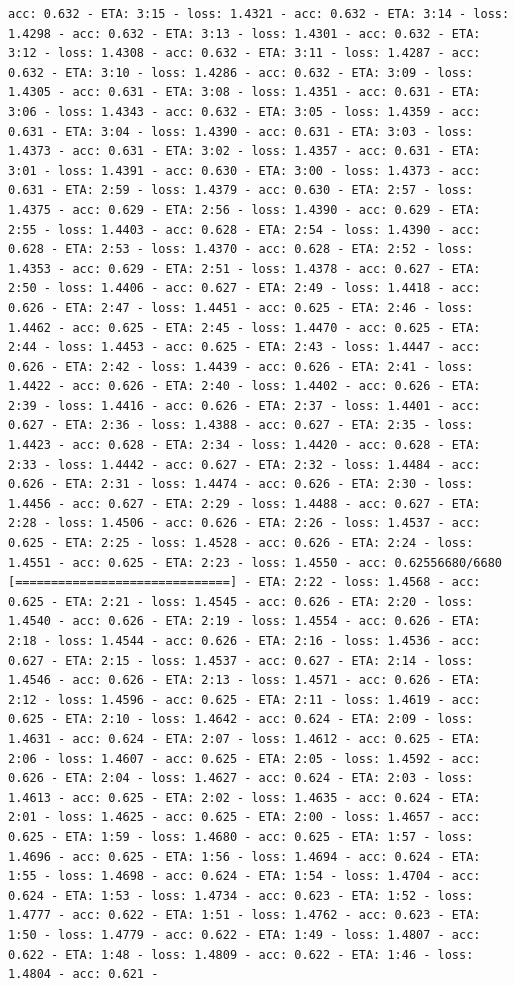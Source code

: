 \documentclass[11pt]{article}
\begin{document}
\begin{Verbatim}[commandchars=\\\{\}]
acc: 0.632 - ETA: 3:15 - loss: 1.4321 - acc: 0.632 - ETA: 3:14 - loss: 1.4298 - acc: 0.632 - ETA: 3:13 - loss: 1.4301 - acc: 0.632 - ETA: 3:12 - loss: 1.4308 - acc: 0.632 - ETA: 3:11 - loss: 1.4287 - acc: 0.632 - ETA: 3:10 - loss: 1.4286 - acc: 0.632 - ETA: 3:09 - loss: 1.4305 - acc: 0.631 - ETA: 3:08 - loss: 1.4351 - acc: 0.631 - ETA: 3:06 - loss: 1.4343 - acc: 0.632 - ETA: 3:05 - loss: 1.4359 - acc: 0.631 - ETA: 3:04 - loss: 1.4390 - acc: 0.631 - ETA: 3:03 - loss: 1.4373 - acc: 0.631 - ETA: 3:02 - loss: 1.4357 - acc: 0.631 - ETA: 3:01 - loss: 1.4391 - acc: 0.630 - ETA: 3:00 - loss: 1.4373 - acc: 0.631 - ETA: 2:59 - loss: 1.4379 - acc: 0.630 - ETA: 2:57 - loss: 1.4375 - acc: 0.629 - ETA: 2:56 - loss: 1.4390 - acc: 0.629 - ETA: 2:55 - loss: 1.4403 - acc: 0.628 - ETA: 2:54 - loss: 1.4390 - acc: 0.628 - ETA: 2:53 - loss: 1.4370 - acc: 0.628 - ETA: 2:52 - loss: 1.4353 - acc: 0.629 - ETA: 2:51 - loss: 1.4378 - acc: 0.627 - ETA: 2:50 - loss: 1.4406 - acc: 0.627 - ETA: 2:49 - loss: 1.4418 - acc: 0.626 - ETA: 2:47 - loss: 1.4451 - acc: 0.625 - ETA: 2:46 - loss: 1.4462 - acc: 0.625 - ETA: 2:45 - loss: 1.4470 - acc: 0.625 - ETA: 2:44 - loss: 1.4453 - acc: 0.625 - ETA: 2:43 - loss: 1.4447 - acc: 0.626 - ETA: 2:42 - loss: 1.4439 - acc: 0.626 - ETA: 2:41 - loss: 1.4422 - acc: 0.626 - ETA: 2:40 - loss: 1.4402 - acc: 0.626 - ETA: 2:39 - loss: 1.4416 - acc: 0.626 - ETA: 2:37 - loss: 1.4401 - acc: 0.627 - ETA: 2:36 - loss: 1.4388 - acc: 0.627 - ETA: 2:35 - loss: 1.4423 - acc: 0.628 - ETA: 2:34 - loss: 1.4420 - acc: 0.628 - ETA: 2:33 - loss: 1.4442 - acc: 0.627 - ETA: 2:32 - loss: 1.4484 - acc: 0.626 - ETA: 2:31 - loss: 1.4474 - acc: 0.626 - ETA: 2:30 - loss: 1.4456 - acc: 0.627 - ETA: 2:29 - loss: 1.4488 - acc: 0.627 - ETA: 2:28 - loss: 1.4506 - acc: 0.626 - ETA: 2:26 - loss: 1.4537 - acc: 0.625 - ETA: 2:25 - loss: 1.4528 - acc: 0.626 - ETA: 2:24 - loss: 1.4551 - acc: 0.625 - ETA: 2:23 - loss: 1.4550 - acc: 0.62556680/6680 [==============================] - ETA: 2:22 - loss: 1.4568 - acc: 0.625 - ETA: 2:21 - loss: 1.4545 - acc: 0.626 - ETA: 2:20 - loss: 1.4540 - acc: 0.626 - ETA: 2:19 - loss: 1.4554 - acc: 0.626 - ETA: 2:18 - loss: 1.4544 - acc: 0.626 - ETA: 2:16 - loss: 1.4536 - acc: 0.627 - ETA: 2:15 - loss: 1.4537 - acc: 0.627 - ETA: 2:14 - loss: 1.4546 - acc: 0.626 - ETA: 2:13 - loss: 1.4571 - acc: 0.626 - ETA: 2:12 - loss: 1.4596 - acc: 0.625 - ETA: 2:11 - loss: 1.4619 - acc: 0.625 - ETA: 2:10 - loss: 1.4642 - acc: 0.624 - ETA: 2:09 - loss: 1.4631 - acc: 0.624 - ETA: 2:07 - loss: 1.4612 - acc: 0.625 - ETA: 2:06 - loss: 1.4607 - acc: 0.625 - ETA: 2:05 - loss: 1.4592 - acc: 0.626 - ETA: 2:04 - loss: 1.4627 - acc: 0.624 - ETA: 2:03 - loss: 1.4613 - acc: 0.625 - ETA: 2:02 - loss: 1.4635 - acc: 0.624 - ETA: 2:01 - loss: 1.4625 - acc: 0.625 - ETA: 2:00 - loss: 1.4657 - acc: 0.625 - ETA: 1:59 - loss: 1.4680 - acc: 0.625 - ETA: 1:57 - loss: 1.4696 - acc: 0.625 - ETA: 1:56 - loss: 1.4694 - acc: 0.624 - ETA: 1:55 - loss: 1.4698 - acc: 0.624 - ETA: 1:54 - loss: 1.4704 - acc: 0.624 - ETA: 1:53 - loss: 1.4734 - acc: 0.623 - ETA: 1:52 - loss: 1.4777 - acc: 0.622 - ETA: 1:51 - loss: 1.4762 - acc: 0.623 - ETA: 1:50 - loss: 1.4779 - acc: 0.622 - ETA: 1:49 - loss: 1.4807 - acc: 0.622 - ETA: 1:48 - loss: 1.4809 - acc: 0.622 - ETA: 1:46 - loss: 1.4804 - acc: 0.621 - 
\end{Verbatim}
\end{document}
